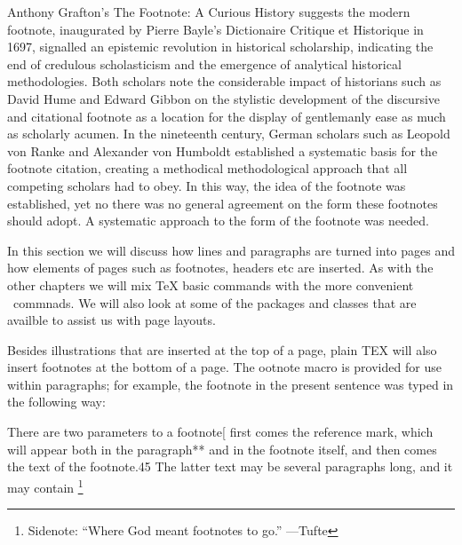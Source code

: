 Anthony Grafton's The Footnote: A Curious History suggests the modern footnote, inaugurated by Pierre Bayle's Dictionaire Critique et Historique in 1697, signalled an epistemic revolution in historical scholarship, indicating the end of credulous scholasticism and the emergence of analytical historical methodologies. Both scholars note the considerable impact of historians such as David Hume and Edward Gibbon on the stylistic development of the discursive and citational footnote as a location for the display of gentlemanly ease as much as scholarly acumen. In the nineteenth century, German scholars such as Leopold von Ranke and Alexander von Humboldt established a systematic basis for the footnote citation, creating a methodical methodological approach that all competing scholars had to obey. In this way, the idea of the footnote was established, yet no there was no general agreement on the form these footnotes should adopt. A systematic approach to the form of the footnote was needed.

In this section we will discuss how lines and paragraphs are turned into pages and how elements of pages such as footnotes, headers etc are inserted. As with the other chapters we will mix TeX basic commands with the more convenient \LaTeXe\ commnads. We will also look at some of the packages and classes that are availble to assist us with page layouts. 


Besides illustrations that are inserted at the top of a page, plain TEX will also
insert footnotes at the bottom of a page. The ootnote macro is provided
for use within paragraphs;  for example, the footnote in the present sentence was typed
in the following way:


There are two parameters to a footnote[ first comes the reference mark, which will
appear both in the paragraph** and in the footnote itself, and then comes the text of
the footnote.45 The latter text may be several paragraphs long, and it may contain
\footnote{Sidenote: ``Where God meant footnotes to go.'' ---Tufte}

